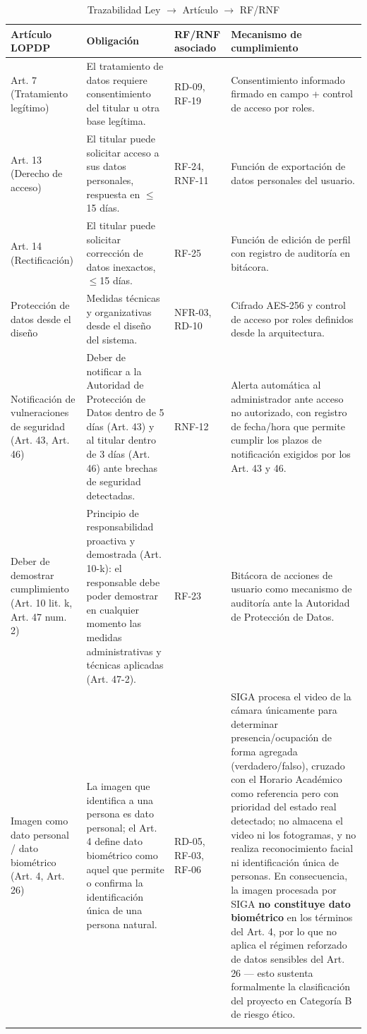 \begingroup
\small
\begin{longtable}{|p{3.9cm}|p{3.9cm}|p{3.9cm}|p{3.9cm}|}
\hline
Artículo LOPDP & Obligación & RF/RNF asociado & Mecanismo de cumplimiento \\ \hline
Art. 7 (Tratamiento legítimo) & El tratamiento de datos requiere consentimiento del titular u otra base legítima. & RD-09, RF-19 & Consentimiento informado firmado en campo + control de acceso por roles. \\ \hline
Art. 13 (Derecho de acceso) & El titular puede solicitar acceso a sus datos personales, respuesta en $\leq$15 días. & RF-24, RNF-11 & Función de exportación de datos personales del usuario. \\ \hline
Art. 14 (Rectificación) & El titular puede solicitar corrección de datos inexactos, $\leq$15 días. & RF-25 & Función de edición de perfil con registro de auditoría en bitácora. \\ \hline
Protección de datos desde el diseño & Medidas técnicas y organizativas desde el diseño del sistema. & NFR-03, RD-10 & Cifrado AES-256 y control de acceso por roles definidos desde la arquitectura. \\ \hline
Notificación de vulneraciones de seguridad (Art. 43, Art. 46) & Deber de notificar a la Autoridad de Protección de Datos dentro de 5 días (Art. 43) y al titular dentro de 3 días (Art. 46) ante brechas de seguridad detectadas. & RNF-12 & Alerta automática al administrador ante acceso no autorizado, con registro de fecha/hora que permite cumplir los plazos de notificación exigidos por los Art. 43 y 46. \\ \hline
Deber de demostrar cumplimiento (Art. 10 lit. k, Art. 47 num. 2) & Principio de responsabilidad proactiva y demostrada (Art. 10-k): el responsable debe poder demostrar en cualquier momento las medidas administrativas y técnicas aplicadas (Art. 47-2). & RF-23 & Bitácora de acciones de usuario como mecanismo de auditoría ante la Autoridad de Protección de Datos. \\ \hline
Imagen como dato personal / dato biométrico (Art. 4, Art. 26) & La imagen que identifica a una persona es dato personal; el Art. 4 define dato biométrico como aquel que permite o confirma la identificación única de una persona natural. & RD-05, RF-03, RF-06 & SIGA procesa el video de la cámara únicamente para determinar presencia/ocupación de forma agregada (verdadero/falso), cruzado con el Horario Académico como referencia pero con prioridad del estado real detectado; no almacena el video ni los fotogramas, y no realiza reconocimiento facial ni identificación única de personas. En consecuencia, la imagen procesada por SIGA \textbf{no constituye dato biométrico} en los términos del Art. 4, por lo que no aplica el régimen reforzado de datos sensibles del Art. 26 --- esto sustenta formalmente la clasificación del proyecto en Categoría B de riesgo ético. \\ \hline
\caption{Trazabilidad Ley $\rightarrow$ Artículo $\rightarrow$ RF/RNF}
\end{longtable}
\endgroup

